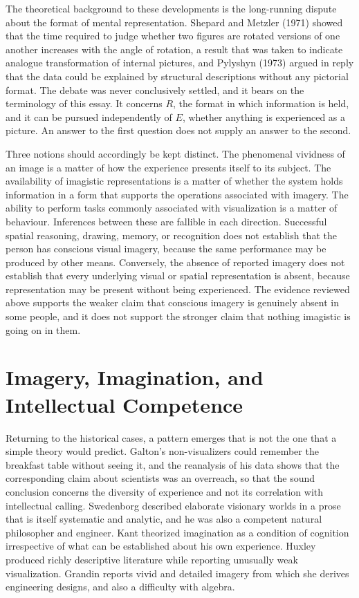 \documentclass[11pt]{article}
\theoremstyle{remark}
\begin{document}
The theoretical background to these developments is the long-running dispute about the format of mental representation. Shepard and Metzler (1971) showed that the time required to judge whether two figures are rotated versions of one another increases with the angle of rotation, a result that was taken to indicate analogue transformation of internal pictures, and Pylyshyn (1973) argued in reply that the data could be explained by structural descriptions without any pictorial format. The debate was never conclusively settled, and it bears on the terminology of this essay. It concerns $R$, the format in which information is held, and it can be pursued independently of $E$, whether anything is experienced as a picture. An answer to the first question does not supply an answer to the second.

Three notions should accordingly be kept distinct. The phenomenal vividness of an image is a matter of how the experience presents itself to its subject. The availability of imagistic representations is a matter of whether the system holds information in a form that supports the operations associated with imagery. The ability to perform tasks commonly associated with visualization is a matter of behaviour. Inferences between these are fallible in each direction. Successful spatial reasoning, drawing, memory, or recognition does not establish that the person has conscious visual imagery, because the same performance may be produced by other means. Conversely, the absence of reported imagery does not establish that every underlying visual or spatial representation is absent, because representation may be present without being experienced. The evidence reviewed above supports the weaker claim that conscious imagery is genuinely absent in some people, and it does not support the stronger claim that nothing imagistic is going on in them.

\section{Imagery, Imagination, and Intellectual Competence}

Returning to the historical cases, a pattern emerges that is not the one that a simple theory would predict. Galton's non-visualizers could remember the breakfast table without seeing it, and the reanalysis of his data shows that the corresponding claim about scientists was an overreach, so that the sound conclusion concerns the diversity of experience and not its correlation with intellectual calling. Swedenborg described elaborate visionary worlds in a prose that is itself systematic and analytic, and he was also a competent natural philosopher and engineer. Kant theorized imagination as a condition of cognition irrespective of what can be established about his own experience. Huxley produced richly descriptive literature while reporting unusually weak visualization. Grandin reports vivid and detailed imagery from which she derives engineering designs, and also a difficulty with algebra.
\end{document}
